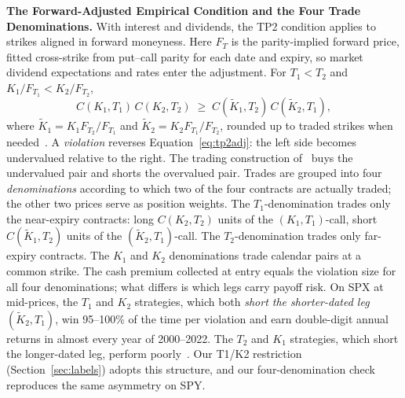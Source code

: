 \documentclass[sigconf,review,anonymous]{acmart}
\begin{document}
\medskip\noindent\textbf{The Forward-Adjusted Empirical Condition and the Four Trade Denominations.}
\label{sec:denominations}
With interest and dividends, the TP2 condition applies to strikes aligned in forward moneyness. Here $F_T$ is the parity-implied forward price, fitted cross-strike from put--call parity for each date and expiry, so market dividend expectations and rates enter the adjustment. For $T_1<T_2$ and $K_1/F_{T_1}<K_2/F_{T_2}$,
\begin{equation}
C(K_1,T_1)\,C(K_2,T_2)\;\ge\;C(\tilde K_1,T_2)\,C(\tilde K_2,T_1),
\label{eq:tp2adj}
\end{equation}
where $\tilde K_1=K_1 F_{T_2}/F_{T_1}$ and $\tilde K_2=K_2 F_{T_1}/F_{T_2}$, rounded up to traded strikes when needed~\cite{glasserman2025tp2}. A \emph{violation} reverses Equation~\eqref{eq:tp2adj}: the left side becomes undervalued relative to the right. The trading construction of~\cite{glasserman2025tp2} buys the undervalued pair and shorts the overvalued pair. Trades are grouped into four \emph{denominations} according to which two of the four contracts are actually traded; the other two prices serve as position weights. The $T_1$-denomination trades only the near-expiry contracts: long $C(K_2,T_2)$ units of the $(K_1,T_1)$-call, short $C(\tilde K_1,T_2)$ units of the $(\tilde K_2,T_1)$-call. The $T_2$-denomination trades only far-expiry contracts. The $K_1$ and $K_2$ denominations trade calendar pairs at a common strike. The cash premium collected at entry equals the violation size for all four denominations; what differs is which legs carry payoff risk. On SPX at mid-prices, the $T_1$ and $K_2$ strategies, which both \emph{short the shorter-dated leg} $(\tilde K_2,T_1)$, win 95--100\% of the time per violation and earn double-digit annual returns in almost every year of 2000--2022. The $T_2$ and $K_1$ strategies, which short the longer-dated leg, perform poorly~\cite{glasserman2025tp2}. Our T1/K2 restriction (Section~\ref{sec:labels}) adopts this structure, and our four-denomination check reproduces the same asymmetry on SPY.
\end{document}
